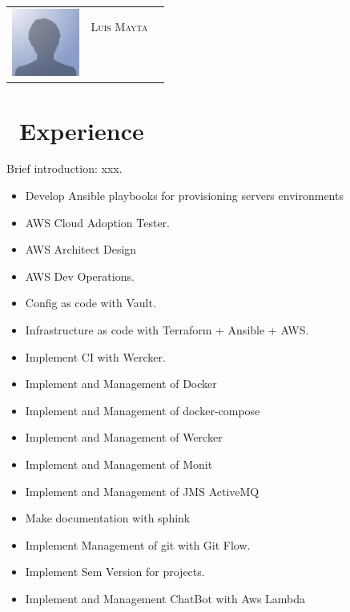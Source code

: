 \documentclass{resume}
\begin{document}


\Large{
  \begin{tabu}{ c l r }
    & \scshape{Luis Mayta} &  \\
    &  &  \\
    &  &  \\
    &  &  \\
    &  & 
  \end{tabu}
}

\section{\faUsers\ Experience}
Brief introduction: xxx.
\begin{itemize}
  \item Develop Ansible playbooks for provisioning servers environments
  \item AWS Cloud Adoption Tester.
  \item AWS Architect Design
  \item AWS Dev Operations.
  \item Config as code with Vault.
  \item Infrastructure as code with Terraform + Ansible + AWS.
  \item Implement CI with Wercker.
  \item Implement and Management of Docker
  \item Implement and Management of docker-compose
  \item Implement and Management of Wercker
  \item Implement and Management of Monit
  \item Implement and Management of JMS ActiveMQ
  \item Make documentation with sphink
  \item Implement Management of git with Git Flow.
  \item Implement Sem Version for projects.
  \item Implement and Management ChatBot with Aws Lambda
\end{itemize}
\end{document}

